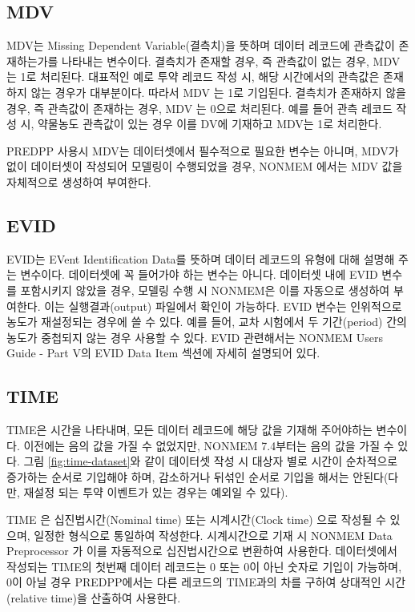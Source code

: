 \documentclass[
  10pt,
  krantz2,
  a4paper]{krantz}
\theoremstyle{definition}
\theoremstyle{definition}
\theoremstyle{definition}
\theoremstyle{remark}
\begin{document}
\hypertarget{mdv}{%
\subsection{MDV}\label{mdv}}

MDV는 Missing Dependent Variable(결측치)을 뜻하며 데이터 레코드에 관측값이 존재하는가를 나타내는 변수이다. 결측치가 존재할 경우, 즉 관측값이 없는 경우, MDV 는 1로 처리된다. 대표적인 예로 투약 레코드 작성 시, 해당 시간에서의 관측값은 존재하지 않는 경우가 대부분이다. 따라서 MDV 는 1로 기입된다. 결측치가 존재하지 않을 경우, 즉 관측값이 존재하는 경우, MDV 는 0으로 처리된다. 예를 들어 관측 레코드 작성 시, 약물농도 관측값이 있는 경우 이를 DV에 기재하고 MDV는 1로 처리한다.

PREDPP 사용시 MDV는 데이터셋에서 필수적으로 필요한 변수는 아니며, MDV가 없이 데이터셋이 작성되어 모델링이 수행되었을 경우, NONMEM 에서는 MDV 값을 자체적으로 생성하여 부여한다.

\hypertarget{evid}{%
\subsection{EVID}\label{evid}}

EVID는 EVent Identification Data를 뜻하며 데이터 레코드의 유형에 대해 설명해 주는 변수이다. 데이터셋에 꼭 들어가야 하는 변수는 아니다. 데이터셋 내에 EVID 변수를 포함시키지 않았을 경우, 모델링 수행 시 NONMEM은 이를 자동으로 생성하여 부여한다. 이는 실행결과(output) 파일에서 확인이 가능하다. EVID 변수는 인위적으로 농도가 재설정되는 경우에 쓸 수 있다. 예를 들어, 교차 시험에서 두 기간(period) 간의 농도가 중첩되지 않는 경우 사용할 수 있다. EVID 관련해서는 NONMEM Users Guide - Part V의 EVID Data Item 섹션에 자세히 설명되어 있다.

\hypertarget{time}{%
\subsection{TIME}\label{time}}

TIME은 시간을 나타내며, 모든 데이터 레코드에 해당 값을 기재해 주어야하는 변수이다. 이전에는 음의 값을 가질 수 없었지만, NONMEM 7.4부터는 음의 값을 가질 수 있다. 그림 \ref{fig:time-dataset}와 같이 데이터셋 작성 시 대상자 별로 시간이 순차적으로 증가하는 순서로 기입해야 하며, 감소하거나 뒤섞인 순서로 기입을 해서는 안된다(다만, 재설정 되는 투약 이벤트가 있는 경우는 예외일 수 있다).

TIME 은 십진법시간(Nominal time) 또는 시계시간(Clock time) 으로 작성될 수 있으며, 일정한 형식으로 통일하여 작성한다. 시계시간으로 기재 시 NONMEM Data Preprocessor 가 이를 자동적으로 십진법시간으로 변환하여 사용한다. 데이터셋에서 작성되는 TIME의 첫번째 데이터 레코드는 0 또는 0이 아닌 숫자로 기입이 가능하며, 0이 아닐 경우 PREDPP에서는 다른 레코드의 TIME과의 차를 구하여 상대적인 시간(relative time)을 산출하여 사용한다.
\end{document}
